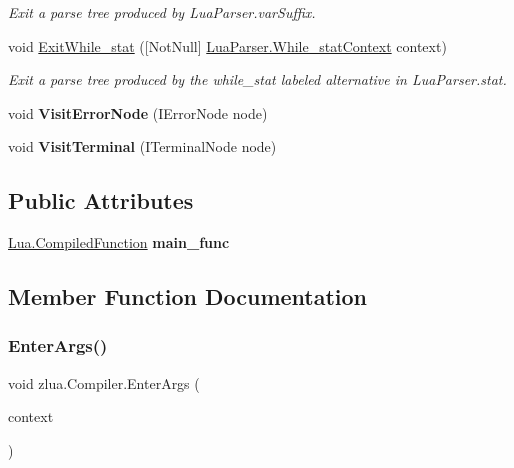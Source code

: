 \begin{DoxyCompactItemize}
\begin{DoxyCompactList}\small\item\em Exit a parse tree produced by Lua\+Parser.\+var\+Suffix. \end{DoxyCompactList}\item 
void \mbox{\hyperlink{classzlua_1_1_compiler_ab9803e477ce65ab3eec9f6013082b4ed}{Exit\+While\+\_\+stat}} (\mbox{[}Not\+Null\mbox{]} \mbox{\hyperlink{classzlua_1_1_lua_parser_1_1_while__stat_context}{Lua\+Parser.\+While\+\_\+stat\+Context}} context)
\begin{DoxyCompactList}\small\item\em Exit a parse tree produced by the {\ttfamily while\+\_\+stat} labeled alternative in Lua\+Parser.\+stat. \end{DoxyCompactList}\item 
\mbox{\label{classzlua_1_1_compiler_afbf7500420bf5084324d0527fca94554}} 
void {\bfseries Visit\+Error\+Node} (I\+Error\+Node node)
\item 
\mbox{\label{classzlua_1_1_compiler_a6f9d07aad44f9114d8a0b8e6cb05f89d}} 
void {\bfseries Visit\+Terminal} (I\+Terminal\+Node node)
\end{DoxyCompactItemize}
\subsection*{Public Attributes}
\begin{DoxyCompactItemize}
\item 
\mbox{\label{classzlua_1_1_compiler_a1c3002f7f7682d516ca3bdd5e0e55499}} 
\mbox{\hyperlink{classzlua_1_1_lua_1_1_compiled_function}{Lua.\+Compiled\+Function}} {\bfseries main\+\_\+func}
\end{DoxyCompactItemize}


\subsection{Member Function Documentation}
\mbox{\label{classzlua_1_1_compiler_a60ee0650123807779b316af7cf7b213d}} 
\subsubsection{\texorpdfstring{Enter\+Args()}{EnterArgs()}}
{\footnotesize\ttfamily void zlua.\+Compiler.\+Enter\+Args (\begin{DoxyParamCaption}\item[{\mbox{[}\+Not\+Null\mbox{]} \mbox{\hyperlink{classzlua_1_1_lua_parser_1_1_args_context}{Lua\+Parser.\+Args\+Context}}}]{context }\end{DoxyParamCaption})}



